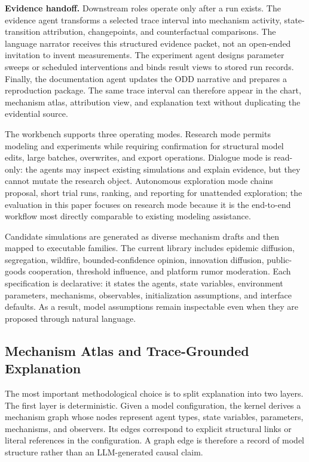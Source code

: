 \documentclass[11pt]{article}
\begin{document}
\textbf{Evidence handoff.} Downstream roles operate only after a run exists. The evidence agent transforms a selected trace interval into mechanism activity, state-transition attribution, changepoints, and counterfactual comparisons. The language narrator receives this structured evidence packet, not an open-ended invitation to invent measurements. The experiment agent designs parameter sweeps or scheduled interventions and binds result views to stored run records. Finally, the documentation agent updates the ODD narrative and prepares a reproduction package. The same trace interval can therefore appear in the chart, mechanism atlas, attribution view, and explanation text without duplicating the evidential source.

The workbench supports three operating modes. Research mode permits modeling and experiments while requiring confirmation for structural model edits, large batches, overwrites, and export operations. Dialogue mode is read-only: the agents may inspect existing simulations and explain evidence, but they cannot mutate the research object. Autonomous exploration mode chains proposal, short trial runs, ranking, and reporting for unattended exploration; the evaluation in this paper focuses on research mode because it is the end-to-end workflow most directly comparable to existing modeling assistance.

Candidate simulations are generated as diverse mechanism drafts and then mapped to executable families. The current library includes epidemic diffusion, segregation, wildfire, bounded-confidence opinion, innovation diffusion, public-goods cooperation, threshold influence, and platform rumor moderation. Each specification is declarative: it states the agents, state variables, environment parameters, mechanisms, observables, initialization assumptions, and interface defaults. As a result, model assumptions remain inspectable even when they are proposed through natural language.

\subsection{Mechanism Atlas and Trace-Grounded Explanation}
\label{subsec:explain}

The most important methodological choice is to split explanation into two layers. The first layer is deterministic. Given a model configuration, the kernel derives a mechanism graph whose nodes represent agent types, state variables, parameters, mechanisms, and observers. Its edges correspond to explicit structural links or literal references in the configuration. A graph edge is therefore a record of model structure rather than an LLM-generated causal claim.
\end{document}
